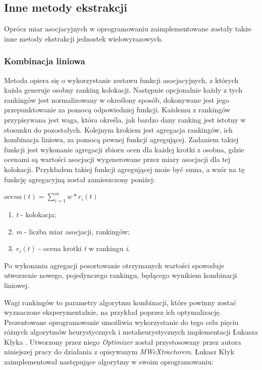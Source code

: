 \subsection{Inne metody ekstrakcji}
Oprócz miar asocjacyjnych w oprogramowaniu zaimplementowane zostały także inne metody ekstrakcji jednostek wielowyrazowych.

\subsubsection{Kombinacja liniowa}
Metoda opiera się o wykorzystanie zestawu funkcji asocjacyjnych, z których każda generuje osobny ranking kolokacji.
Następnie opcjonalnie każdy z tych rankingów jest normalizowany w określony sposób, dokonywane jest jego przepunktowanie za pomocą odpowiedniej funkcji.
Każdemu z rankingów przypisywana jest waga, która określa, jak bardzo dany ranking jest istotny w stosunku do pozostałych.
Kolejnym krokiem jest agregacja rankingów, ich kombinacja liniowa, za pomocą pewnej funkcji agregującej.
Zadaniem takiej funkcji jest wykonanie agregacji zbioru ocen dla każdej krotki z osobna, gdzie ocenami są wartości asocjacji wygenerowane przez miary asocjacji dla tej kolokacji.
Przykładem takiej funkcji agregującej może być suma, a wzór na tę funkcję agregacyjną został zamieszczony poniżej:
\begin{center}
\( ocena(t) = \sum_{i=1}^{m} w * r_{i}(t) \)
\end{center}

\begin{enumerate}
	\item \emph{t} - kolokacja;
	\item \emph{m} - liczba miar asocjacji, rankingów;
	\item \( r_{i}(t) \) - ocena krotki \emph{t} w rankingu \emph{i}.
\end{enumerate}

Po wykonaniu agregacji posortowanie otrzymanych wartości spowoduje utworzenie nowego, pojedynczego rankingu, będącego wynikiem kombinacji liniowej.
\par
Wagi rankingów to parametry algorytmu kombinacji, które powinny zostać wyznaczone eksperymentalnie, na przykład poprzez ich optymalizację.
Prezentowane oprogramowanie umożliwia wykorzystanie do tego celu pięciu różnych algorytmów heurystycznych i metaheurystycznych implementacji Łukasza Kłyka \cite{klyk}.
Utworzony przez niego \emph{Optimizer} został przystosowany przez autora niniejszej pracy do działania z opisywanym \emph{MWeXtractorem}.
Łukasz Kłyk zaimplementował następujące algorytmy w swoim oprogramowaniu:

